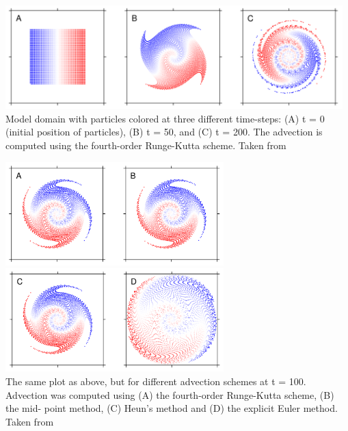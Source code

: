 \begin{center}
\includegraphics[height=4cm]{images/rk/maie12a}\\
{\captionfont Model domain with particles colored at three
different time-steps: (A) t = 0 (initial position of particles), (B) t = 50, and (C) t = 200.
The advection is computed using the fourth-order Runge-Kutta scheme. Taken from \cite{maie12}}
\end{center}

\begin{center}
\includegraphics[height=4cm]{images/rk/maie12b}
\includegraphics[height=4cm]{images/rk/maie12c}\\
{\captionfont The same plot as above, but for different advection schemes at t = 100.
Advection was computed using (A) the fourth-order Runge-Kutta scheme, (B) the mid-
point method, (C) Heun’s method and (D) the explicit Euler method. Taken from \cite{maie12}}
\end{center}


\bscthesis {}



